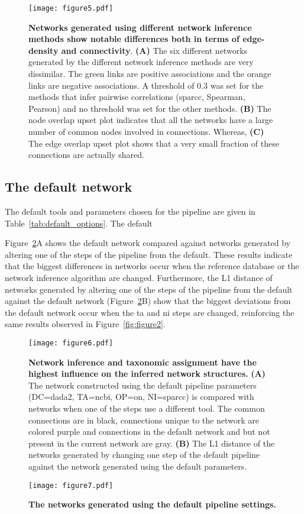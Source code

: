   \begin{figure}[h]
    \centering
    \texttt{[image: figure5.pdf]}
    \caption{
      \textbf{Networks generated using different network inference methods show notable differences both in terms of edge-density and connectivity}.
      \textbf{(A)} The six different networks generated by the different network inference methods are very dissimilar.
      The green links are positive associations and the orange links are negative associations.
      A threshold of 0.3 was set for the methods that infer pairwise correlations (\ac{sparcc}, Spearman, Pearson) and no threshold was set for the other methods.
      \textbf{(B)} The node overlap upset plot indicates that all the networks have a large number of common nodes involved in connections.
      Whereas, \textbf{(C)} The edge overlap upset plot shows that a very small fraction of these connections are actually shared.
    }
    \label{fig:figure5}
  \end{figure}

  \FloatBarrier

  \subsection*{The default network}

  The default tools and parameters chosen for the pipeline are given in Table~\ref{tab:default_options}.
  The default

  Figure~\ref{fig:figure6}A shows the default network compared against networks generated by altering one of the steps of the pipeline from the default.
  These results indicate that the biggest differences in networks occur when the reference database or the network inference algorithm are changed.
  Furthermore, the L1 distance of networks generated by altering one of the steps of the pipeline from the default against the default network (Figure~\ref{fig:figure6}B) show that the biggest deviations from the default network occur when the \ac{ta} and \ac{ni} steps are changed, reinforcing the same results observed in Figure~\ref{fig:figure2}.

  \begin{figure}[h]
    \centering
    \texttt{[image: figure6.pdf]}
    \caption{
      \textbf{Network inference and taxonomic assignment have the highest influence on the inferred network structures.}
      \textbf{(A)} The network constructed using the default pipeline parameters (DC=\ac{dada2}, TA=\ac{ncbi}, OP=on, NI=\ac{sparcc}) is compared with networks when one of the steps use a different tool.
      The common connections are in black, connections unique to the network are colored purple and connections in the default network and but not present in the current network are gray.
      \textbf{(B)} The L1 distance of the networks generated by changing one step of the default pipeline against the network generated using the default parameters.
    }
    \label{fig:figure6}
  \end{figure}


  \begin{figure}[h]
    \centering
    \texttt{[image: figure7.pdf]}
    \caption{
      \textbf{The networks generated using the default pipeline settings.}
  }
    \label{fig:figure7}
  \end{figure}
